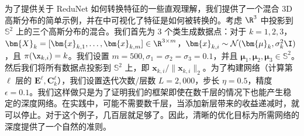 \documentclass[../../book-main_zh.tex]{subfiles}
\begin{document}
\begin{example}
    为了提供关于 ReduNet 如何转换特征的一些直观理解，我们提供了一个混合 3D 高斯分布的简单示例，并在中可视化了特征是如何被转换的。考虑 $\R^{3}$ 中投影到 $\mathbb{S}^2$ 上的三个高斯分布的混合。我们首先为 3 个类生成数据点：对于 $k=1,2,3$，$\bm{X}_{k}=[\bm{x}_{k,1},
    \ldots, \bm{x}_{k,m}] \in \R^{3\times m}$，$\bm{x}_{k,i} \sim
    \mathcal{N}(\bm{\mu}_{k}, \sigma_{k}^{2} \I)$，且 ${\pi}(\x_{k,i}) = k$。我们设置 $m=500, \sigma_{1}=\sigma_{2}=\sigma_{3}=0.1$，并且 $\bm{\mu}_{1}, \bm{\mu}_{2}, \bm{\mu}_{3} \in \mathbb{S}^2$。然后我们将所有数据点投影到 $\mathbb{S}^{2}$ 上，即 $\bm{x}_{k,i}/\|\bm{x}_{k,i}\|_{2}$。为了构建网络（计算第 $\ell$ 层的 $\bm{E}^{\ell},
    \bm{C}^{\ell}_{k}$），我们设置迭代次数/层数 $L=2,000$，步长 $\eta=0.5$，精度 $\epsilon=0.1$。我们这样做只是为了证明我们的框架即使在数千层的情况下也能产生稳定的深度网络。在实践中，可能不需要数千层，当添加新层带来的收益递减时，就可以停止。对于这个例子，几百层就足够了。因此，清晰的优化目标为所需网络的深度提供了一个自然的准则。


\end{example}
\end{document}
